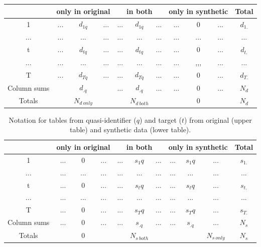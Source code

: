 \documentclass[12pt]{article}
\begin{document}
\begin{center}
\begin{table}[ht]
\begin{tabular}{ c|ccc|ccc|ccc|c} 
 & \multicolumn{3}{|c|}{only in original} & \multicolumn{3}{|c|}{in both} & \multicolumn{3}{|c|}{only in synthetic} & Total\\
 \hline
1  & ... & $d_{1q}$ & ...  & ... & $d_{1q}$ & ...  & ... & 0 & ... & $d_{1.}$ \\
 ... & ... & ... & ...  & ... & ... & ...  & ... & ... & ... & ... \\
t  & ... & $d_{tq}$  & ...  & ... & $d_{tq}$ & ...  & ... & 0 & ... & $d_{t.}$ \\
... & ... & ... & ...  & ... & ... & ...  & ... & ,,, & ... & ... \\
T  & ... & $d_{Tq}$ & ...  & ... & $d_{Tq}$ & ...  & ... & 0 & ... & $d_{T.}$ \\
 \hline
Column sums  & & $d_{.q}$ &  & ... & $d_{.q}$ & ...  & ... & 0 & ... & $N_d$ \\
 \hline
Totals  &  & $N_{d\:only}$ &  & & $N_{d~both}$ &  & & 0 &  & $N_d$ \\
\end{tabular}
\end{table}
\begin{table}[ht]
\begin{tabular}{ c|ccc|ccc|ccc|c} 
 & \multicolumn{3}{|c|}{only in original} & \multicolumn{3}{|c|}{in both} & \multicolumn{3}{|c|}{only in synthetic} & Total\\
 \hline
1  & ... & 0 & ...  & ... & $s_1q$ & ...  & ... & $s_1q$ & ... & $s_{1.}$ \\
 ... & ... & ... & ...  & ... & ... & ...  & ... & ... & ... & ... \\
t  & ... & 0 & ...  & ... & $s_tq$ & ...  & ... & $s_tq$ & ... & $s_{t.}$ \\
... & ... & ... & ...  & ... & ... & ...  & ... & ... & ... & ... \\
T  & ... & 0 & ...  & ... & $s_Tq$ & ...  & ... & $s_Tq$ & ... & $s_{T.}$ \\
 \hline
Column sums  & ... & 0 & ...  & ... & $s_{.q}$ & ...  & ... & $s_{.q}$ & ... & $N_s$ \\
 \hline
Totals  &  & 0 &  & & $N_{s~both}$ &  &  &  & $N_{s\:only}$ & $N_s$ \\

\end{tabular}
\caption{Notation for tables from quasi-identifier ($q$) and target ($t$) from original (upper table) and synthetic data (lower table).}
\label{table:2}
\end{table}
\end{center}
\end{document}
